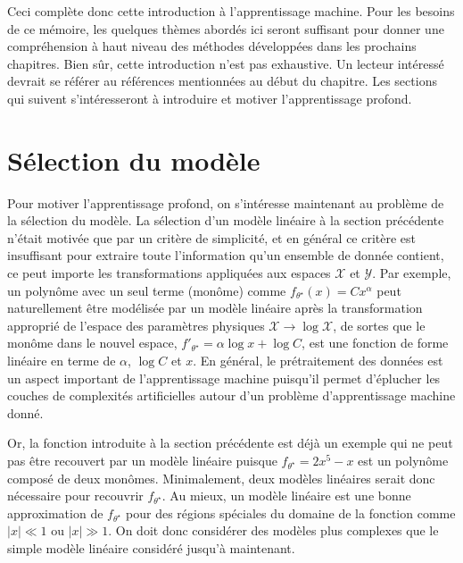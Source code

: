 Ceci complète donc cette introduction à l'apprentissage machine. 
Pour les besoins de ce mémoire, les quelques thèmes abordés ici seront suffisant
pour donner une compréhension à haut niveau des méthodes développées dans les prochains chapitres. Bien sûr, 
cette introduction n'est pas exhaustive. Un lecteur intéressé devrait se référer au références mentionnées au début du 
chapitre.
Les sections qui suivent s'intéresseront à introduire et motiver l'apprentissage profond.


\section{Sélection du modèle}\label{sec:selection modele}

Pour motiver l'apprentissage profond, on s'intéresse maintenant au problème de la sélection du modèle. 
La sélection d'un modèle linéaire à la section précédente n'était motivée que par un critère de simplicité, et en général 
ce critère est insuffisant pour extraire toute l'information qu'un ensemble de donnée contient, ce peut importe les transformations appliquées 
aux espaces $\mathcal{X}$ et $\mathcal{Y}$. Par exemple, un polynôme avec un seul terme (monôme) comme $f_{\theta^{\star}}(x) = Cx^{\alpha}$ peut naturellement être modélisée 
par un modèle linéaire après la transformation approprié de l'espace des paramètres physiques $\mathcal{X} \rightarrow  \log \mathcal{X}$, de sortes 
que le monôme dans le nouvel espace, $f'_{\theta^{\star}} = \alpha \log x + \log C$, est une fonction de forme linéaire en terme de $\alpha$, $\log C$ et $x$.
En général, le prétraitement des données est un aspect important de l'apprentissage machine puisqu'il permet d'éplucher les couches 
de complexités artificielles autour d'un problème d'apprentissage machine donné.

Or, la fonction introduite à la section précédente est déjà un exemple qui ne peut pas être recouvert par un modèle linéaire puisque 
$f_{\theta^{\star}} = 2x^{5} - x$ est un polynôme composé de deux monômes. Minimalement, deux modèles linéaires serait donc nécessaire pour recouvrir $f_{\theta^{\star}}$.
Au mieux, un modèle linéaire est une bonne approximation de $f_{\theta^{\star}}$ pour des régions spéciales du domaine de la fonction comme $|x| \ll 1$ ou $|x| \gg 1$.
On doit donc considérer des modèles plus complexes que le simple modèle linéaire considéré jusqu'à maintenant.

